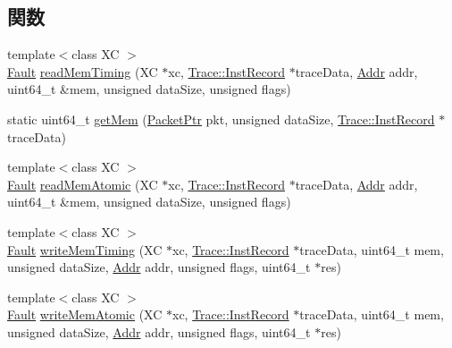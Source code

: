 \subsection*{関数}
\begin{DoxyCompactItemize}
\item 
{\footnotesize template$<$class XC $>$ }\\\hyperlink{classRefCountingPtr}{Fault} \hyperlink{namespaceX86ISA_a6541d95ba049bea304004bc765578697}{readMemTiming} (XC $\ast$xc, \hyperlink{classTrace_1_1InstRecord}{Trace::InstRecord} $\ast$traceData, \hyperlink{base_2types_8hh_af1bb03d6a4ee096394a6749f0a169232}{Addr} addr, uint64\_\-t \&mem, unsigned dataSize, unsigned flags)
\item 
static uint64\_\-t \hyperlink{namespaceX86ISA_a71e49bc75208629f6958a8479a19bb22}{getMem} (\hyperlink{classPacket}{PacketPtr} pkt, unsigned dataSize, \hyperlink{classTrace_1_1InstRecord}{Trace::InstRecord} $\ast$traceData)
\item 
{\footnotesize template$<$class XC $>$ }\\\hyperlink{classRefCountingPtr}{Fault} \hyperlink{namespaceX86ISA_a3afb16e9fda02e17519871c8004ebdb9}{readMemAtomic} (XC $\ast$xc, \hyperlink{classTrace_1_1InstRecord}{Trace::InstRecord} $\ast$traceData, \hyperlink{base_2types_8hh_af1bb03d6a4ee096394a6749f0a169232}{Addr} addr, uint64\_\-t \&mem, unsigned dataSize, unsigned flags)
\item 
{\footnotesize template$<$class XC $>$ }\\\hyperlink{classRefCountingPtr}{Fault} \hyperlink{namespaceX86ISA_a758dc026bb35ddb9da038acfb4f8ac3a}{writeMemTiming} (XC $\ast$xc, \hyperlink{classTrace_1_1InstRecord}{Trace::InstRecord} $\ast$traceData, uint64\_\-t mem, unsigned dataSize, \hyperlink{base_2types_8hh_af1bb03d6a4ee096394a6749f0a169232}{Addr} addr, unsigned flags, uint64\_\-t $\ast$res)
\item 
{\footnotesize template$<$class XC $>$ }\\\hyperlink{classRefCountingPtr}{Fault} \hyperlink{namespaceX86ISA_a6a314d196cff35a2cc8043015e5dcc8b}{writeMemAtomic} (XC $\ast$xc, \hyperlink{classTrace_1_1InstRecord}{Trace::InstRecord} $\ast$traceData, uint64\_\-t mem, unsigned dataSize, \hyperlink{base_2types_8hh_af1bb03d6a4ee096394a6749f0a169232}{Addr} addr, unsigned flags, uint64\_\-t $\ast$res)
\end{DoxyCompactItemize}
